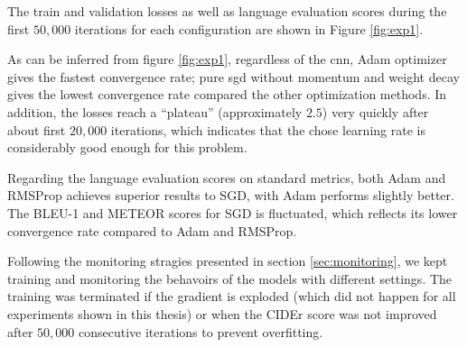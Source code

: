 The train and validation losses as well as language evaluation scores during the first $50,000$ iterations for each configuration are shown in Figure \ref{fig:exp1}. 

As can be inferred from figure \ref{fig:exp1}, regardless of the \gls{cnn}, Adam optimizer gives the fastest convergence rate; pure \gls{sgd} without momentum and weight decay gives the lowest convergence rate compared the other optimization methods. In addition, the losses reach a ``plateau'' (approximately $2.5$) very quickly after about first $20,000$ iterations, which indicates that the chose learning rate is considerably good enough for this problem.  

Regarding the language evaluation scores on standard metrics, both Adam and RMSProp achieves superior results to SGD, with Adam performs slightly better. The BLEU-1 and METEOR scores for SGD is fluctuated, which reflects its lower convergence rate compared to Adam and RMSProp.

Following the monitoring stragies presented in section \ref{sec:monitoring}, we kept training and monitoring the behavoirs of the models with different settings. The training was terminated if the gradient is exploded (which did not happen for all experiments shown in this thesis) or when the CIDEr score was not improved after $50,000$ consecutive iterations to prevent overfitting. 

